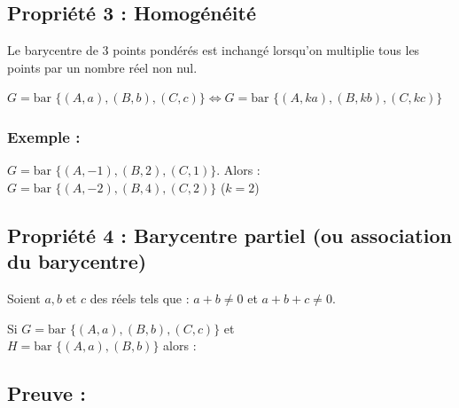\documentclass{article}
\begin{document}
\vspace{2em}

\subsection*{Propriété 3 : Homogénéité}

\noindent Le barycentre de 3 points pondérés est inchangé lorsqu'on multiplie tous les points par un nombre réel non nul.

\vspace{1em}

\noindent $G = \text{bar } \{(A, a), (B, b), (C, c)\} \iff G = \text{bar } \{(A, ka), (B, kb), (C, kc)\}$

\subsubsection*{Exemple :}

\noindent $G = \text{bar } \{(A, -1), (B, 2), (C, 1)\}$. Alors : \\
$G = \text{bar } \{(A, -2), (B, 4), (C, 2)\}$ \quad ($k = 2$)

\vspace{2em}

\subsection*{Propriété 4 : Barycentre partiel (ou association du barycentre)}

\noindent Soient $a, b$ et $c$ des réels tels que : $a + b \neq 0$ et $a + b + c \neq 0$.

\vspace{1em}

\noindent Si $G = \text{bar } \{(A, a), (B, b), (C, c)\}$ et \\
$H = \text{bar } \{(A, a), (B, b)\}$ alors :

\vspace{1.5em}

\begin{center}
    \color{red}
\end{center}

\vspace{2em}

\subsection*{Preuve :}
\end{document}
